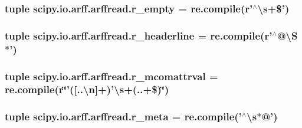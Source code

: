 \subsubsection[{r\+\_\+empty}]{\setlength{\rightskip}{0pt plus 5cm}tuple scipy.\+io.\+arff.\+arffread.\+r\+\_\+empty = re.\+compile({\bf r}'$^\wedge$\textbackslash{}{\bf s}+\$')}\label{namespacescipy_1_1io_1_1arff_1_1arffread_a7dde3e116c88d73a339c27b54cccdf23}
\hypertarget{namespacescipy_1_1io_1_1arff_1_1arffread_a3bf854b4ee21d61af48f38bd13498240}{}
\subsubsection[{r\+\_\+headerline}]{\setlength{\rightskip}{0pt plus 5cm}tuple scipy.\+io.\+arff.\+arffread.\+r\+\_\+headerline = re.\+compile({\bf r}'$^\wedge$@\textbackslash{}S$\ast$')}\label{namespacescipy_1_1io_1_1arff_1_1arffread_a3bf854b4ee21d61af48f38bd13498240}
\hypertarget{namespacescipy_1_1io_1_1arff_1_1arffread_a554073042943c47336e15bb2873a1802}{}
\subsubsection[{r\+\_\+mcomattrval}]{\setlength{\rightskip}{0pt plus 5cm}tuple scipy.\+io.\+arff.\+arffread.\+r\+\_\+mcomattrval = re.\+compile({\bf r}\char`\"{}'(\mbox{[}..\textbackslash{}n\mbox{]}+)'\textbackslash{}{\bf s}+(..+\$)\char`\"{})}\label{namespacescipy_1_1io_1_1arff_1_1arffread_a554073042943c47336e15bb2873a1802}
\hypertarget{namespacescipy_1_1io_1_1arff_1_1arffread_aaee5fb44344792389adb63f8fe891f45}{}
\subsubsection[{r\+\_\+meta}]{\setlength{\rightskip}{0pt plus 5cm}tuple scipy.\+io.\+arff.\+arffread.\+r\+\_\+meta = re.\+compile('$^\wedge$\textbackslash{}{\bf s}$\ast$@')}\label{namespacescipy_1_1io_1_1arff_1_1arffread_aaee5fb44344792389adb63f8fe891f45}
\hypertarget{namespacescipy_1_1io_1_1arff_1_1arffread_aa7b8cb61c29f4f0212e873442bbc014f}{}
